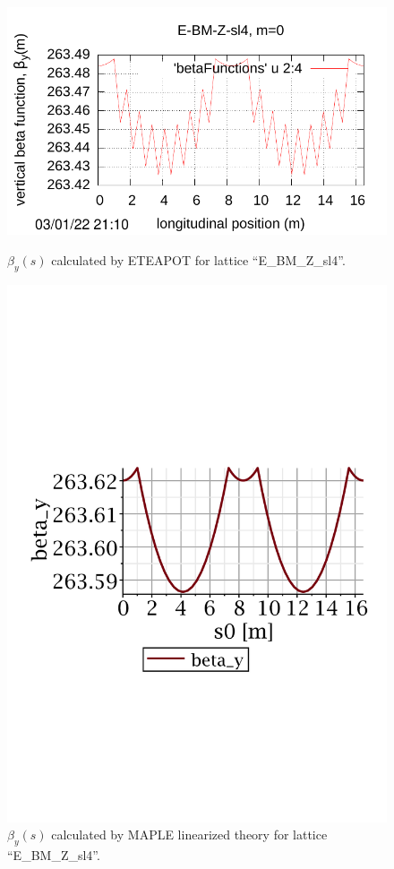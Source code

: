 \documentclass[]{article}
\begin{document}
%
%
\begin{figure}[htbp]
\hspace{-0.6cm}
\begin{minipage}[b]{0.5\linewidth}
\centering
\includegraphics[scale=0.6]{pdf/Fig_II-7.pdf}
\caption{$\beta_y(s)$ calculated by ETEAPOT 
for lattice ``E\_BM\_Z\_sl4''.}
\label{fig:UAL_Z_betay}
\end{minipage}
%
%
\begin{minipage}[b]{0.49\linewidth}
\centering
\includegraphics[scale=0.45]{pdf/E_BM_Z_2-betay.pdf}
\caption{$\beta_y(s)$ calculated by MAPLE linearized 
theory for lattice ``E\_BM\_Z\_sl4''.}
\label{fig:RT_Z_betay}
\end{minipage}
\end{figure}
%
\end{document}

